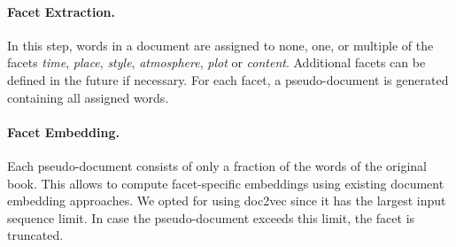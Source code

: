 \documentclass[11pt]{article}
\begin{document}
\paragraph{Facet Extraction.}
In this step, words in a document are assigned to none, one, or multiple of the facets \textit{time}, \textit{place}, \textit{style}, \textit{atmosphere}, \textit{plot} or \textit{content}.
Additional facets can be defined in the future if necessary.
For each facet, a pseudo-document is generated containing all assigned words.

\paragraph{Facet Embedding.}
Each pseudo-document consists of only a fraction of the words of the original book.
This allows to compute facet-specific embeddings using existing document embedding approaches.
We opted for using doc2vec since it has the largest input sequence limit.
In case the pseudo-document exceeds this limit, the facet is truncated.
\end{document}
